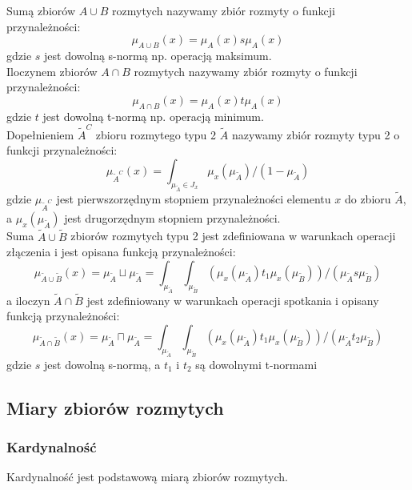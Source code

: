 \documentclass{classrep}
\begin{document}
Sumą zbiorów $A \cup B$ rozmytych nazywamy zbiór rozmyty o funkcji przynależności:
\begin{equation}
\mu_{A \cup B}(x)=\mu_A(x)s\mu_A(x)
\end{equation}
gdzie $s$ jest dowolną s-normą np. operacją maksimum.
\\

Iloczynem zbiorów $A \cap B$ rozmytych nazywamy zbiór rozmyty o funkcji przynależności:
\begin{equation}
\mu_{A \cap B}(x)=\mu_A(x)t\mu_A(x)
\end{equation}
gdzie $t$ jest dowolną t-normą np. operacją minimum.
\\

Dopełnieniem $\tilde{A}^C$ zbioru rozmytego typu 2 $\tilde{A}$ nazywamy zbiór rozmyty typu 2 o funkcji przynależności:
\begin{equation}
\mu_{\tilde{A}^C}(x)=\int_{\mu_{\tilde{A}} \in J_x} \mu_x(\mu_{\tilde{A}})/(1-\mu_{\tilde{A}})
 \end{equation}
gdzie $\mu_{\tilde{A}^C}$ jest pierwszorzędnym stopniem przynależności elementu $x$ do zbioru $\tilde{A}$, a $\mu_x(\mu_{\tilde{A}})$ jest drugorzędnym stopniem przynależności.
\\

Suma $\tilde{A} \cup \tilde{B}$ zbiorów rozmytych typu 2 jest zdefiniowana w warunkach operacji złączenia i jest opisana funkcją przynależności:
\begin{equation}
\mu_{\tilde{A} \cup \tilde{B}}(x) = \mu_{\tilde{A}} \sqcup \mu_{\tilde{A}} = \int_{\mu_{\tilde{A}}}\int_{\mu_{\tilde{B}}}(\mu_x(\mu_{\tilde{A}}) t_1 \mu_x(\mu_{\tilde{B}}))/(\mu_{\tilde{A}} s \mu_{\tilde{B}})
\end{equation}
a iloczyn $\tilde{A} \cap \tilde{B}$ jest zdefiniowany w warunkach operacji spotkania i opisany funkcją przynależności:
\begin{equation}
\mu_{\tilde{A} \cap \tilde{B}}(x) = \mu_{\tilde{A}} \sqcap \mu_{\tilde{A}} = \int_{\mu_{\tilde{A}}}\int_{\mu_{\tilde{B}}}(\mu_x(\mu_{\tilde{A}}) t_1 \mu_x(\mu_{\tilde{B}}))/(\mu_{\tilde{A}} t_2 \mu_{\tilde{B}})
\end{equation}
gdzie $s$ jest dowolną s-normą, a $t_1$ i $t_2$ są dowolnymi t-normami

\subsection{Miary zbiorów rozmytych}
\subsubsection{Kardynalność}
Kardynalność jest podstawową miarą zbiorów rozmytych.
\end{document}
